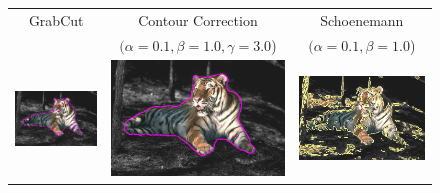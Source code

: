 \documentclass[runningheads]{llncs}
\begin{document}
\begin{figure}
	\center
	\begin{tabular}{ccc}
		GrabCut & Contour Correction & Schoenemann \\
		& $(\alpha=0.1, \beta=1.0, \gamma=3.0$) & $(\alpha=0.1, \beta=1.0$)\\
		\includegraphics[scale=0.2]{images/segmentation/tiger1/gc-seg.png} &
		\includegraphics[scale=0.2]{images/segmentation/tiger1/corrected-seg.png} &					\includegraphics[scale=0.2]{images/segmentation/schoenemann/tiger1/tiger1-seg.png}\\									

\end{tabular}
\end{figure}
\end{document}
